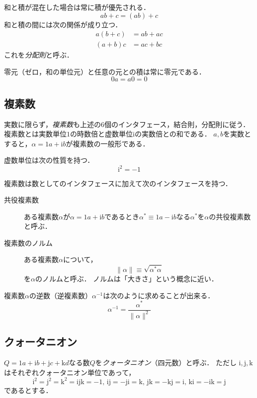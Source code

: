 \documentclass{jsbook}
\newcommand{\keyword}[1]{\emph{#1}}
\newcommand{\zero}{0}%
\newcommand{\one}{1}%
\newcommand{\im}{\mathrm{i}}%
\newcommand{\ii}{\mathrm{i}}%
\newcommand{\jj}{\mathrm{j}}%
\newcommand{\kk}{\mathrm{k}}%
\newcommand{\norm}[1]{\|{#1}\|}
\begin{document}
和と積が混在した場合は常に積が優先される．
\begin{equation}
ab+c=(ab)+c
\end{equation}
和と積の間には次の関係が成り立つ．
\begin{align}
a(b+c)&=ab+ac\\
(a+b)c&=ac+bc
\end{align}
これを\keyword{分配則}と呼ぶ．

零元（ゼロ，和の単位元）と任意の元との積は常に零元である．
\begin{equation}
\zero a=a\zero =\zero
\end{equation}

\subsection{複素数}

実数に限らず，\keyword{複素数}も上述の6個のインタフェース，結合則，分配則に従う．
複素数とは実数単位$\one$の時数倍と虚数単位$\im$の実数倍との和である．
$a,b$を実数とすると，$\alpha=\one a+\im b$が複素数の一般形である．

虚数単位は次の性質を持つ．
\begin{equation}
\im^2=-\one
\end{equation}

複素数は数としてのインタフェースに加えて次のインタフェースを持つ．
\begin{description}
\item[共役複素数] ある複素数$\alpha$が$\alpha=\one a+\im b$であるとき$\alpha^*\equiv\one a-\im b$なる$\alpha^*$を$\alpha$の共役複素数と呼ぶ．
\item[複素数のノルム] ある複素数$\alpha$について，
\begin{equation}
\norm{\alpha}\equiv\sqrt{\alpha^*\alpha}
\end{equation}
を$\alpha$のノルムと呼ぶ．
ノルムは「大きさ」という概念に近い．
\end{description}

複素数$\alpha$の逆数（逆複素数）$\alpha^{-1}$は次のように求めることが出来る．
\begin{equation}
\alpha^{-1}=\frac{\alpha^*}{\norm{\alpha}^2}
\end{equation}

\subsection{クォータニオン}

$Q=\one a+\ii b+\jj c+\kk d$なる数$Q$を\keyword{クォータニオン}（四元数）と呼ぶ．
ただし $\ii,\jj,\kk$ はそれぞれクォータニオン単位であって，
\begin{equation}
\ii^2=\jj^2=\kk^2=\ii\jj\kk=-\one,\,
\ii\jj=-\jj\ii=\kk,\,
\jj\kk=-\kk\jj=\ii,\,
\kk\ii=-\ii\kk=\jj
\end{equation}
であるとする．
\end{document}

